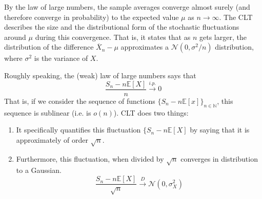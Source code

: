 \documentclass{article}
\theoremstyle{definition}
\theoremstyle{remark}
\theoremstyle{definition}
\begin{document}
By the law of large numbers, the sample averages converge almost surely (and therefore converge in probability) to the expected value $\mu$ as $n \rightarrow \infty$. The CLT describes the size and the distributional form of the stochastic fluctuations around $\mu$ during this convergence. That is, it states that as $n$ gets larger, the distribution of the difference $\overline{X}_n - \mu$ approximates a $\mathcal{N}(0, \sigma^2 / n)$ distribution, where $\sigma^2$ is the variance of $X$. 


Roughly speaking, the (weak) law of large numbers says that 
\[\frac{S_n - n \mathbb{E}[X]}{n} \xrightarrow{i.p.} 0\]
That is, if we consider the sequence of functions $\{S_n - n \mathbb{E}[x]\}_{n \in \mathbb{N}}$, this sequence is sublinear (i.e. is $o(n)$). CLT does two things: 
\begin{enumerate}
    \item It specifically quantifies this fluctuation $\{S_n - n \mathbb{E}[X]$ by saying that it is approximately of order $\sqrt{n}$. 
    \item Furthermore, this fluctuation, when divided by $\sqrt{n}$ converges in distribution to a Gaussian. 
    \[\frac{S_n - n \mathbb{E}[X]}{\sqrt{n}} \xrightarrow{D} \mathcal{N}(0, \sigma_X^2)\]
\end{enumerate}
\end{document}
